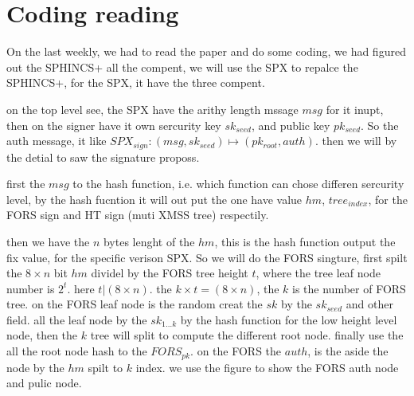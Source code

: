 \documentclass[report]{../../custom}
\begin{document}
\maketitle

\section{Coding reading}

On the last weekly, we had to read the paper and do some coding, we had figured out the SPHINCS+ all the compent, we will use the SPX to repalce the SPHINCS+, for the SPX, it have the three compent.

on the top level see, the SPX have the arithy length mssage $msg$ for it inupt, then on the signer have it own sercurity key $sk_{seed}$, and public key $pk_{seed}$. So the auth message, it like $SPX_{sign}: (msg,sk_{seed}) \mapsto (pk_{root},auth)$. then we will by the detial to saw the signature proposs.

first the $msg$ to the hash function, i.e. which function can chose differen sercurity level, by the hash fucntion it will out put the one have value $hm$, $tree_{index}$, for the FORS sign and HT sign (muti XMSS tree) respectily.

then we have the $n$ bytes lenght of the $hm$, this is the hash function output the fix value, for the specific verison SPX. So we will do the FORS singture,
first spilt the $8\times n$ bit $hm$ dividel by the FORS tree height $t$, where the tree leaf node number is $2^t$. here $t | (8\times n)$. the $k\times t=(8\times n)$, the $k$ is the number of FORS tree. on the FORS leaf node is the random creat the $sk$ by the $sk_{seed}$ and other field.
all the leaf node by the $sk_{1\dots k}$ by the hash function for the low height level node, then the $k$ tree will split to compute the different root node. finally use the all the root node hash to the $FORS_{pk}$. on the FORS the $auth$, is the aside the node by the $hm$ spilt to $k$ index.
we use the figure to show the FORS auth node and pulic node.


\end{document}
